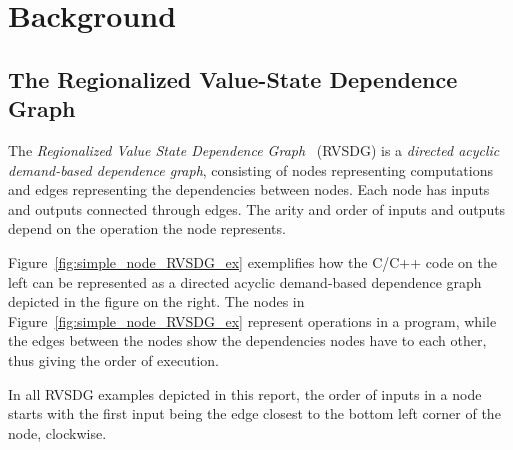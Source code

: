 
\clearpage
\section{Background}
\label{background}

\subsection{The Regionalized Value-State Dependence Graph}
\label{background:RVSDG}

The \textit{Regionalized Value State Dependence Graph}~\cite{RVSDG:HiPEACpaper}
(RVSDG) is a \textit{directed acyclic demand-based dependence graph},
consisting of nodes representing computations and edges representing the
dependencies between nodes. Each node has inputs and outputs connected through
edges. The arity and order of inputs and outputs depend on the operation the
node represents.

Figure~\ref{fig:simple_node_RVSDG_ex} exemplifies how the C/C++ code on the left
can be represented as a directed acyclic demand-based dependence graph depicted
in the figure on the right. The nodes in Figure~\ref{fig:simple_node_RVSDG_ex}
represent operations in a program, while the edges between the nodes show the
dependencies nodes have to each other, thus giving the order of execution.

In all RVSDG examples depicted in this report, the order of inputs in a node
starts with the first input being the edge closest to the bottom left corner of
the node, clockwise.


